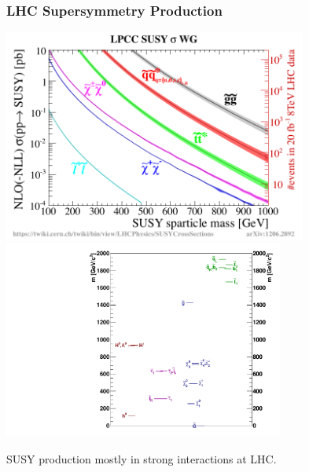\documentclass{beamer}
\begin{document}
\begin{frame}
\frametitle{LHC Supersymmetry Production}
 \begin{minipage}[t]{0.5\linewidth}
   \includegraphics[height=7cm,width=0.45\paperwidth]{THESISPLOTS/SUSY-XSEC.pdf}
   \includegraphics[height=6.5cm,width=0.40\paperwidth]{THESISPLOTS/gmsb_Lambda180_CTau10000.pdf}
 \end{minipage} 
   
 \begin{minipage}[b]{\linewidth}
   SUSY production mostly in strong interactions at LHC.
 \end{minipage}
\end{frame}
\end{document}
